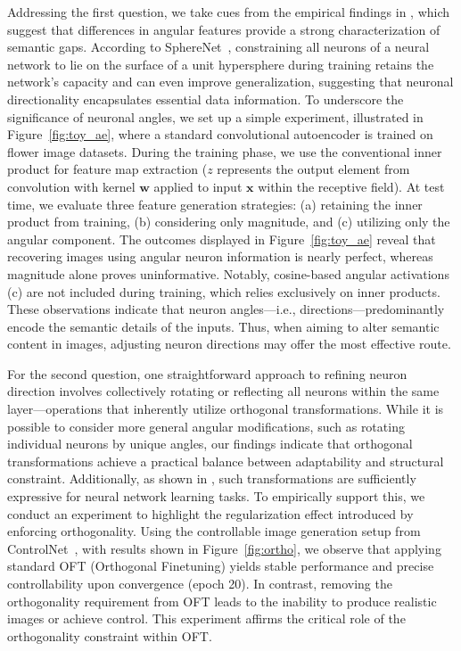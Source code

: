 Addressing the first question, we take cues from the empirical findings in \cite{liu2018decoupled,chen2020angular}, which suggest that differences in angular features provide a strong characterization of semantic gaps. According to SphereNet~\cite{liu2017deep}, constraining all neurons of a neural network to lie on the surface of a unit hypersphere during training retains the network’s capacity and can even improve generalization, suggesting that neuronal directionality encapsulates essential data information. To underscore the significance of neuronal angles, we set up a simple experiment, illustrated in Figure~\ref{fig:toy_ae}, where a standard convolutional autoencoder is trained on flower image datasets. During the training phase, we use the conventional inner product for feature map extraction ($z$ represents the output element from convolution with kernel $\bm{w}$ applied to input $\bm{x}$ within the receptive field). At test time, we evaluate three feature generation strategies: (a) retaining the inner product from training, (b) considering only magnitude, and (c) utilizing only the angular component. The outcomes displayed in Figure~\ref{fig:toy_ae} reveal that recovering images using angular neuron information is nearly perfect, whereas magnitude alone proves uninformative. Notably, cosine-based angular activations (c) are not included during training, which relies exclusively on inner products. These observations indicate that neuron angles—i.e., directions—predominantly encode the semantic details of the inputs. Thus, when aiming to alter semantic content in images, adjusting neuron directions may offer the most effective route.

For the second question, one straightforward approach to refining neuron direction involves collectively rotating or reflecting all neurons within the same layer—operations that inherently utilize orthogonal transformations. While it is possible to consider more general angular modifications, such as rotating individual neurons by unique angles, our findings indicate that orthogonal transformations achieve a practical balance between adaptability and structural constraint. Additionally, as shown in \cite{liu2021orthogonal}, such transformations are sufficiently expressive for neural network learning tasks. To empirically support this, we conduct an experiment to highlight the regularization effect introduced by enforcing orthogonality. Using the controllable image generation setup from ControlNet~\cite{zhang2023adding}, with results shown in Figure~\ref{fig:ortho}, we observe that applying standard OFT (Orthogonal Finetuning) yields stable performance and precise controllability upon convergence (epoch 20). In contrast, removing the orthogonality requirement from OFT leads to the inability to produce realistic images or achieve control. This experiment affirms the critical role of the orthogonality constraint within OFT.

